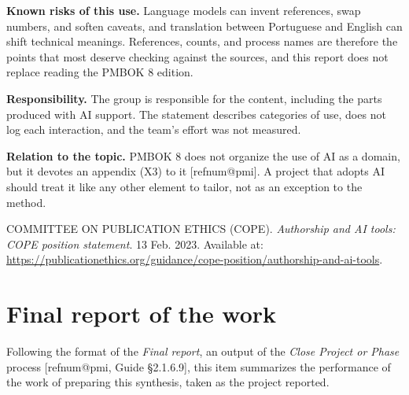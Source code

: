 \documentclass[11pt,a4paper]{article}
\makeatletter
\newcommand{\refnum}[1]{\csname refnum@#1\endcsname}
\newcommand{\cit}[1]{[\refnum{#1}]}
\makeatother
\begin{document}
\textbf{Known risks of this use.} Language models can invent references, swap numbers, and soften caveats, and translation between Portuguese and English can shift technical meanings. References, counts, and process names are therefore the points that most deserve checking against the sources, and this report does not replace reading the PMBOK 8 edition.

\textbf{Responsibility.} The group is responsible for the content, including the parts produced with AI support. The statement describes categories of use, does not log each interaction, and the team's effort was not measured.

\textbf{Relation to the topic.} PMBOK 8 does not organize the use of AI as a domain, but it devotes an appendix (X3) to it \cit{pmi}. A project that adopts AI should treat it like any other element to tailor, not as an exception to the method.

\begingroup\small\noindent COMMITTEE ON PUBLICATION ETHICS (COPE). \textit{Authorship and AI tools: COPE position statement}. 13 Feb. 2023. Available at: \url{https://publicationethics.org/guidance/cope-position/authorship-and-ai-tools}.\par\endgroup
\fi

\section{Final report of the work}

Following the format of the \textit{Final report}, an output of the \textit{Close Project or Phase} process [\refnum{pmi}, Guide §2.1.6.9], this item summarizes the performance of the work of preparing this synthesis, taken as the project reported.
\end{document}
